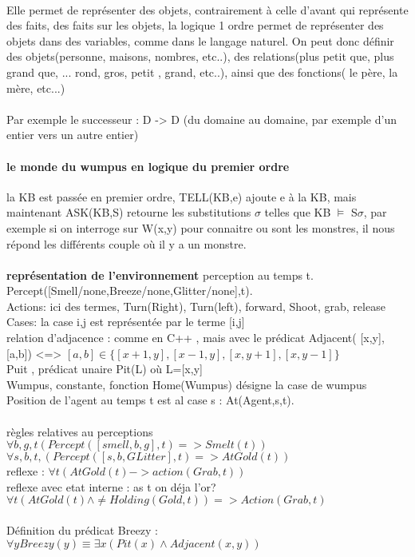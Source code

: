 \documentclass{article}
\begin{document}
\paragraph{} Elle permet de représenter des objets, contrairement à celle d'avant qui représente des faits, des faits sur les objets, la logique 1 ordre permet de représenter des objets dans des variables, comme dans le langage naturel. On peut donc définir des objets(personne, maisons, nombres, etc..), des relations(plus petit que, plus grand que, ... rond, gros, petit , grand, etc..), ainsi que des fonctions( le père, la mère, etc...)\\\\
Par exemple le successeur : D -> D (du domaine au domaine, par exemple d'un entier vers un autre entier)
\paragraph{le monde du wumpus en logique du premier ordre} la KB est passée en premier ordre, TELL(KB,e) ajoute e à la KB, mais maintenant ASK(KB,S) retourne les substitutions $\sigma$ telles que KB $\models$ S$\sigma$, par exemple si on interroge sur W(x,y) pour connaitre ou sont les monstres, il nous répond les différents couple où il y a un monstre.\\\\
\textbf{représentation de l'environnement} perception au temps t. Percept([Smell/none,Breeze/none,Glitter/none],t).\\Actions:  ici des termes, Turn(Right), Turn(left), forward, Shoot, grab, release\\
Cases: la case i,j est représentée par le terme [i,j]\\relation d'adjacence : comme en C++ , mais avec le prédicat Adjacent( [x,y],[a,b]) <=> $[a,b]\in \{[x+1,y],[x-1,y],[x,y+1],[x,y-1]\}$\\Puit , prédicat unaire Pit(L) où L=[x,y]\\
Wumpus, constante, fonction Home(Wumpus) désigne la case de wumpus\\Position de l'agent au temps t est al case s : At(Agent,s,t).

\paragraph{} règles relatives au perceptions\\
 $\forall b,g,t(Percept([smell,b,g],t) =>Smelt(t))$\\
$\forall s,b,t,(Percept([s,b,GLitter],t) => AtGold(t))$\\
reflexe : $\forall t (AtGold(t) -> action(Grab,t))$\\
reflexe avec etat interne : as t on déja l'or?\\
$\forall t(AtGold(t) \wedge \neq Holding(Gold,t))=>Action(Grab,t)$\\\\
Définition du prédicat Breezy : $\forall y Breezy(y) \equiv \exists x (Pit(x) \wedge Adjacent(x,y))$
\end{document}
